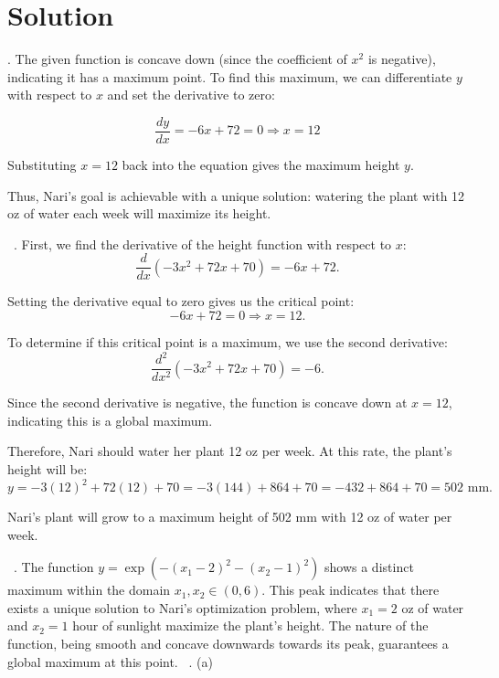 \documentclass{harvardml}
\theoremstyle{definition}
\theoremstyle{plain}
\newenvironment{solution}
  {\color{blue}\section*{Solution}}
{}
\begin{document}
\begin{solution}
. The given function is concave down (since the coefficient of \( x^2 \) is negative), indicating it has a maximum point. To find this maximum, we can differentiate \( y \) with respect to \( x \) and set the derivative to zero:

\[
\frac{dy}{dx} = -6x + 72 = 0 \Rightarrow x = 12
\]

Substituting \( x = 12 \) back into the equation gives the maximum height \( y \).

Thus, Nari’s goal is achievable with a unique solution: watering the plant with 12 oz of water each week will maximize its height.

\ . First, we find the derivative of the height function with respect to \(x\):
\[
\frac{d}{dx}(-3x^2 + 72x + 70) = -6x + 72.
\]

Setting the derivative equal to zero gives us the critical point:
\[
-6x + 72 = 0 \Rightarrow x = 12.
\]

To determine if this critical point is a maximum, we use the second derivative:
\[
\frac{d^2}{dx^2}(-3x^2 + 72x + 70) = -6.
\]

Since the second derivative is negative, the function is concave down at \(x = 12\), indicating this is a global maximum.

Therefore, Nari should water her plant 12 oz per week. At this rate, the plant's height will be:
\[
y = -3(12)^2 + 72(12) + 70 = -3(144) + 864 + 70 = -432 + 864 + 70 = 502 \text{ mm}.
\]

Nari's plant will grow to a maximum height of 502 mm with 12 oz of water per week.

\ . The function \(y = \exp(-(x_1 - 2)^2 - (x_2 - 1)^2)\) shows a distinct maximum within the domain \(x_1, x_2 \in (0, 6)\). This peak indicates that there exists a unique solution to Nari’s optimization problem, where \(x_1 = 2\) oz of water and \(x_2 = 1\) hour of sunlight maximize the plant's height. The nature of the function, being smooth and concave downwards towards its peak, guarantees a global maximum at this point.
\ . (a) 

\end{solution}


\color{black}
\end{document}

